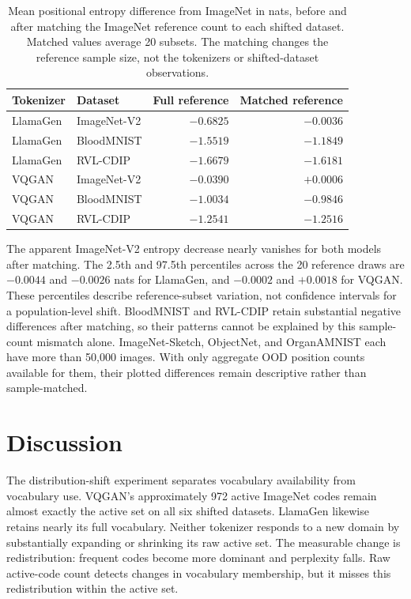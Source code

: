 \begin{table}[t]
    \centering
    \scriptsize
    \setlength{\tabcolsep}{4pt}
    \begin{tabular}{llrr}
        \textbf{Tokenizer} & \textbf{Dataset} & \textbf{Full reference} & \textbf{Matched reference} \\ \hline
        LlamaGen & ImageNet-V2 & $-0.6825$ & $-0.0036$ \\
        LlamaGen & BloodMNIST  & $-1.5519$ & $-1.1849$ \\
        LlamaGen & RVL-CDIP    & $-1.6679$ & $-1.6181$ \\ \hline
        VQGAN    & ImageNet-V2 & $-0.0390$ & $+0.0006$ \\
        VQGAN    & BloodMNIST  & $-1.0034$ & $-0.9846$ \\
        VQGAN    & RVL-CDIP    & $-1.2541$ & $-1.2516$ \\
    \end{tabular}
    \caption{Mean positional entropy difference from ImageNet in nats, before
    and after matching the ImageNet reference count to each shifted dataset.
    Matched values average 20 subsets. The matching changes the reference
    sample size, not the tokenizers or shifted-dataset observations.}
    \label{tab:rq5_matched_entropy}
\end{table}

The apparent ImageNet-V2 entropy decrease nearly vanishes for both models
after matching. The 2.5th and 97.5th percentiles across the 20 reference
draws are $-0.0044$ and $-0.0026$ nats for LlamaGen, and $-0.0002$ and
$+0.0018$ for VQGAN. These percentiles describe reference-subset variation,
not confidence intervals for a population-level shift. BloodMNIST and
RVL-CDIP retain substantial negative differences after
matching, so their patterns cannot be explained by this sample-count mismatch
alone. ImageNet-Sketch, ObjectNet, and OrganAMNIST each have more than 50{,}000
images. With only aggregate OOD position counts available for them, their
plotted differences remain descriptive rather than sample-matched.

\section{Discussion}
\label{sec:rq5_discussion}

The distribution-shift experiment separates vocabulary availability from
vocabulary use. VQGAN's approximately 972 active ImageNet codes remain almost
exactly the active set on all six shifted datasets. LlamaGen likewise retains
nearly its full vocabulary. Neither tokenizer responds to a new domain by
substantially expanding or shrinking its raw active set. The measurable change
is redistribution: frequent codes become more dominant and perplexity falls.
Raw active-code count detects changes in vocabulary membership, but it misses
this redistribution within the active set.

